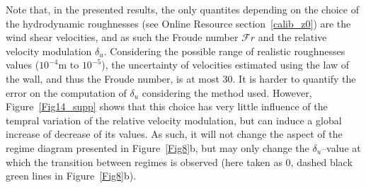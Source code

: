 Note that, in the presented results, the only quantites depending on the choice of the hydrodynamic roughnesses (see Online Resource section~\ref{calib_z0}) are the wind shear velocities, and as such the Froude number $\mathcal{F}r$ and the relative velocity modulation $\delta_{u}$. Considering the possible range of realistic roughnesses values ($10^{-4}$m to $10^{-5}$), the uncertainty of velocities estimated using the law of the wall, and thus the Froude number, is at most $30$. It is harder to quantify the error on the computation of $\delta_{u}$ considering the method used. However, Figure~\ref{Fig14_supp} shows that this choice has very little influence of the tempral variation of the relative velocity modulation, but can induce a global increase of decrease of its values. As such, it will not change the aspect of the regime diagram presented in Figure~\ref{Fig8}b, but may only change the $\delta_{u}$--value at which the transition between regimes is observed (here taken as 0, dashed black green lines in Figure~\ref{Fig8}b).

